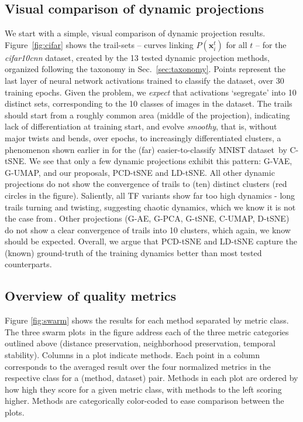 \subsection{Visual comparison of dynamic projections}
\label{sec:visual_comp}
%
We start with a simple, visual comparison of dynamic projection results. Figure~\ref{fig:cifar} shows the trail-sets -- curves linking $P(\mathbf{x}_i^t)$ for all $t$ -- for the \emph{cifar10cnn} dataset, created by the 13 tested dynamic projection methods, organized following the taxonomy in Sec.~\ref{sec:taxonomy}. Points represent the last layer of neural network activations trained to classify the dataset, over 30 training epochs. Given the problem, we \emph{expect} that activations `segregate' into 10 distinct sets, corresponding to the 10 classes of images in the dataset. The trails should start from a roughly common area (middle of the projection), indicating lack of differentiation at training start, and evolve \emph{smoothy}, that is, without major twists and bends, over epochs, to increasingly differentiated clusters, a phenomenon shown earlier in for the (far) easier-to-classify MNIST dataset\,\cite{Rauber2017} by C-tSNE. We see that only a few dynamic projections exhibit this pattern: G-VAE, G-UMAP, and our proposals, PCD-tSNE and LD-tSNE. All other dynamic projections do not show the convergence of trails to (ten) distinct clusters (red circles in the figure). Saliently, all TF variants show far too high dynamics - long trails turning and twisting, suggesting chaotic dynamics, which we know it is not the case from\,\cite{Rauber2017}. Other projections (G-AE, G-PCA, G-tSNE, C-UMAP, D-tSNE) do not show a clear convergence of trails into 10 clusters, which again, we know should be expected. Overall, we argue that PCD-tSNE and LD-tSNE capture the (known) ground-truth of the training dynamics better than most tested counterparts.

\subsection{Overview of quality metrics}
%
Figure \ref{fig:swarm} shows the results for each method separated by metric class. The three swarm plots\,\cite{swarm} in the figure address each of the three metric categories outlined above (distance preservation, neighborhood preservation, temporal stability). Columns in a plot indicate methods. Each point in a column corresponds to the averaged result over the four normalized metrics in the respective class for a (method, dataset) pair. Methods in each plot are ordered by how high they score for a given metric class, with methods to the left scoring higher. Methods are categorically color-coded to ease comparison between the plots.

